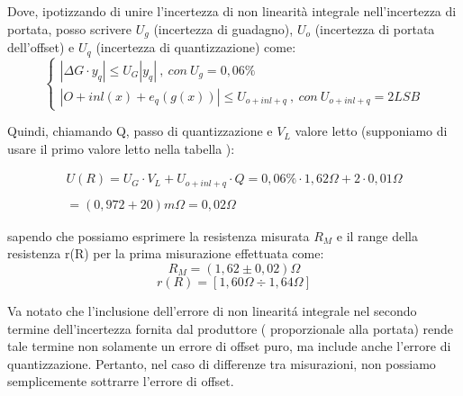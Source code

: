 Dove, ipotizzando di unire l'incertezza di non linearità integrale nell'incertezza di portata, posso scrivere $U_g$ (incertezza di guadagno), $U_o$ (incertezza di portata dell'offset) e $U_q$ (incertezza di quantizzazione) come: 
\begin{equation}
\left\{\begin{array}{l}
    | \Delta G \cdot y_q | \leq U_G |y_q| \ , \ con \ U_g=0,06\% \\
| O + inl(x) + e_q(g(x)) | \leq U_{o+inl+q} \ , \ con \ U_{o+inl+q}=2LSB
\end{array}\right.
\end{equation}

Quindi, chiamando Q, passo di quantizzazione e $V_L$ valore letto (supponiamo di usare il primo valore letto nella tabella \label{mult_port}):

\begin{equation*}
\begin{array}{l}
U(R) = U_G \cdot V_L + U_{o+inl+q} \cdot Q = 0,06\% \cdot 1,62\Omega + 2 \cdot 0,01 \Omega \\ \\
= (0,972 + 20) m\Omega = 0,02 \Omega
\end{array}
\end{equation*}

sapendo che possiamo esprimere la resistenza misurata $R_M$ e il range della resistenza r(R) per la prima misurazione effettuata come:
\begin{equation*}
    R_M = (1,62 \pm 0,02) \Omega
\end{equation*}
\begin{equation*}
    r(R) = [1,60 \Omega \div 1,64 \Omega]
\end{equation*}

Va notato che l'inclusione dell'errore di non linearit\'a integrale nel secondo termine dell'incertezza fornita dal produttore ( proporzionale alla portata) rende tale termine non solamente un errore di offset puro, ma include anche l'errore di quantizzazione. Pertanto, nel caso di differenze tra misurazioni, non possiamo semplicemente sottrarre l'errore di offset.

